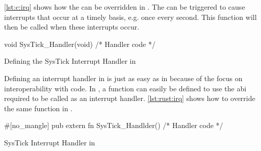 \autoref{lst:c:irq} shows how the  can be overridden in {\C}.
The {\gecko} can be triggered to cause interrupts that occur at a timely basis, e.g. once every second.
This function will then be called when these interrupts occur.

\begin{listing}[H]
  \begin{ccode}
void SysTick_Handler(void) { /* Handler code */ }
  \end{ccode}
  \caption{Defining the SysTick Interrupt Handler in {\C}}
  \label{lst:c:irq}
\end{listing}

Defining an interrupt handler in {\rust} is just as easy as in {\C} because of the focus on interoperability with {\C} code.
In {\rust}, a function can easily be defined to use the {\C} \glsdesc{abi} required to be called as an interrupt handler.
\autoref{lst:rust:irq} shows how to override the same  function in {\rust}.

\begin{listing}[H]
  \begin{rustcode}
#[no_mangle] pub extern fn SysTick_Handlder() { /* Handler code */ }
  \end{rustcode}
  \caption{SysTick Interrupt Handler in {\rust}}
  \label{lst:rust:irq}
\end{listing}

